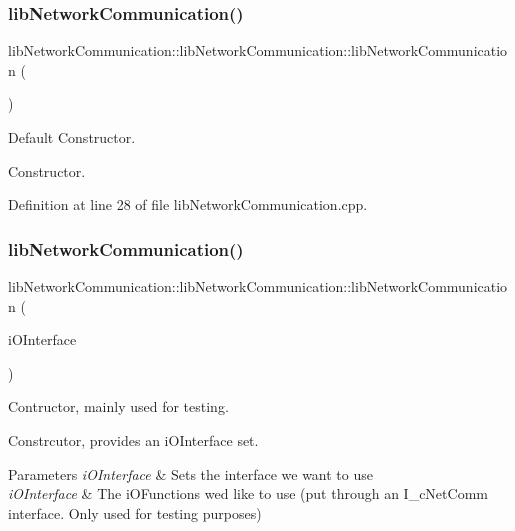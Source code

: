 \subsubsection{\texorpdfstring{libNetworkCommunication()}{libNetworkCommunication()}\hspace{0.1cm}{\footnotesize\ttfamily [1/2]}}
{\footnotesize\ttfamily lib\+Network\+Communication\+::lib\+Network\+Communication\+::lib\+Network\+Communication (\begin{DoxyParamCaption}{ }\end{DoxyParamCaption})}



Default Constructor. 

Constructor. 

Definition at line 28 of file lib\+Network\+Communication.\+cpp.

\mbox{\label{classlibNetworkCommunication_1_1libNetworkCommunication_aa76eab73e3cd744e3b498aba32fbc071}} 
\subsubsection{\texorpdfstring{libNetworkCommunication()}{libNetworkCommunication()}\hspace{0.1cm}{\footnotesize\ttfamily [2/2]}}
{\footnotesize\ttfamily lib\+Network\+Communication\+::lib\+Network\+Communication\+::lib\+Network\+Communication (\begin{DoxyParamCaption}\item[{std\+::shared\+\_\+ptr$<$ \mbox{\hyperlink{classcFunctions_1_1I__cNetComm}{c\+Functions\+::\+I\+\_\+c\+Net\+Comm}} $>$}]{i\+O\+Interface }\end{DoxyParamCaption})\hspace{0.3cm}{\ttfamily [explicit]}}



Contructor, mainly used for testing. 

Constrcutor, provides an i\+O\+Interface set.


\begin{DoxyParams}{Parameters}
{\em i\+O\+Interface} & Sets the interface we want to use\\
\hline
{\em i\+O\+Interface} & The i\+O\+Functions we\textquotesingle{}d like to use (put through an I\+\_\+c\+Net\+Comm interface. Only used for testing purposes) \\
\hline
\end{DoxyParams}



